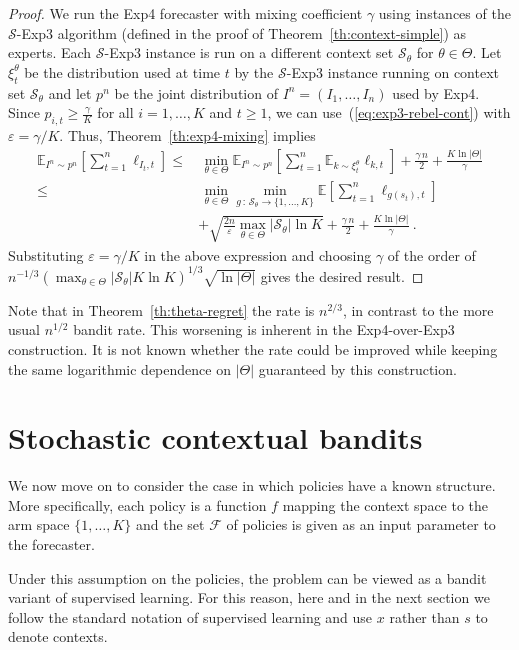 \documentclass[11pt]{hackednow}
\newcommand{\E}{\mathbb{E}}
\newcommand{\cF}{\mathcal{F}}
\newcommand{\cS}{\mathcal{S}}
\newcommand{\ve}{\varepsilon}
\begin{document}
\begin{proof}
We run the Exp4 forecaster with mixing coefficient $\gamma$ using instances of the $\cS$-Exp3 algorithm (defined in the proof of Theorem~\ref{th:context-simple}) as experts. Each $\cS$-Exp3 instance is run on a different context set $\cS_{\theta}$ for $\theta\in\Theta$. Let $\xi_t^{\theta}$ be the distribution used at time $t$ by the $\cS$-Exp3 instance running on context set $\cS_{\theta}$ and let $p^n$ be the joint distribution of $I^n = (I_1,\dots,I_n)$ used by Exp4. Since $p_{i,t} \ge \tfrac{\gamma}{K}$ for all $i=1,\dots,K$ and $t\ge 1$, we can use~(\ref{eq:exp3-rebel-cont}) with $\ve = \gamma/K$. Thus, Theorem~\ref{th:exp4-mixing} implies
\begin{align*}
    \E_{I^n \sim p^n}\left[ \sum_{t=1}^n \ell_{I_t,t} \right]
\le &\,
    \min_{\theta\in\Theta} \E_{I^n \sim p^n}\left[\sum_{t=1}^n \E_{k \sim \xi_t^\theta} \ell_{k,t} \right]
+
    \frac{\gamma\,n}{2} + \frac{K\ln|\Theta|}{\gamma}
\\ \le &\,
    \min_{\theta\in\Theta} \min_{g \,:\, \cS_{\theta}\to\{1,\dots,K\}} \E\left[ \sum_{t=1}^n \ell_{g(s_t),t} \right]
\\ &
    + \sqrt{\frac{2 n}{\ve}\max_{\theta\in\Theta}|\cS_{\theta}| \ln K} + \frac{\gamma\,n}{2} + \frac{K\ln |\Theta|}{\gamma}~.
\end{align*}
Substituting $\ve = \gamma/K$ in the above expression and choosing $\gamma$ of the order of
$
	n^{-1/3}\left(\max_{\theta\in\Theta}|\cS_{\theta}|K\ln K\right)^{1/3}\sqrt{\ln|\Theta|}
$
gives the desired result.
\end{proof}
Note that in Theorem~\ref{th:theta-regret} the rate is $n^{2/3}$, in contrast to the more usual $n^{1/2}$ bandit rate. This worsening is inherent in the Exp4-over-Exp3 construction. It is not known whether the rate could be improved while keeping the same logarithmic dependence on $|\Theta|$ guaranteed by this construction.


\section{Stochastic contextual bandits}
\label{s:context-stochastic}
We now move on to consider the case in which policies have a known structure. More specifically, each policy is a function $f$ mapping the context space to the arm space $\{1,\dots,K\}$ and the set $\cF$ of policies is given as an input parameter to the forecaster.

Under this assumption on the policies, the problem can be viewed as a bandit variant of supervised learning. For this reason, here and in the next section we follow the standard notation of supervised learning and use $x$ rather than $s$ to denote contexts.
\end{document}
